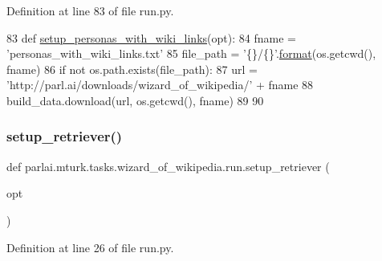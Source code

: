 Definition at line 83 of file run.\+py.


\begin{DoxyCode}
83 \textcolor{keyword}{def }\hyperlink{namespaceparlai_1_1mturk_1_1tasks_1_1wizard__of__wikipedia_1_1run_a5c16caa932230f93c418facd793be473}{setup\_personas\_with\_wiki\_links}(opt):
84     fname = \textcolor{stringliteral}{'personas\_with\_wiki\_links.txt'}
85     file\_path = \textcolor{stringliteral}{'\{\}/\{\}'}.\hyperlink{namespaceparlai_1_1chat__service_1_1services_1_1messenger_1_1shared__utils_a32e2e2022b824fbaf80c747160b52a76}{format}(os.getcwd(), fname)
86     \textcolor{keywordflow}{if} \textcolor{keywordflow}{not} os.path.exists(file\_path):
87         url = \textcolor{stringliteral}{'http://parl.ai/downloads/wizard\_of\_wikipedia/'} + fname
88         build\_data.download(url, os.getcwd(), fname)
89 
90 
\end{DoxyCode}
\mbox{\label{namespaceparlai_1_1mturk_1_1tasks_1_1wizard__of__wikipedia_1_1run_a22eb017ecd8f1a211fc5aac511d3102e}} 
\subsubsection{\texorpdfstring{setup\+\_\+retriever()}{setup\_retriever()}}
{\footnotesize\ttfamily def parlai.\+mturk.\+tasks.\+wizard\+\_\+of\+\_\+wikipedia.\+run.\+setup\+\_\+retriever (\begin{DoxyParamCaption}\item[{}]{opt }\end{DoxyParamCaption})}



Definition at line 26 of file run.\+py.


